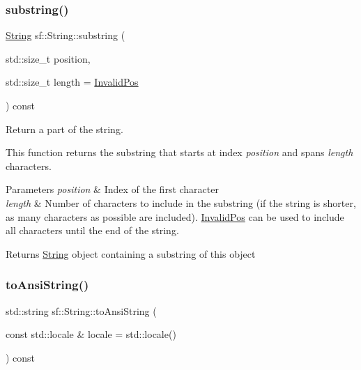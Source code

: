 \subsubsection{\texorpdfstring{substring()}{substring()}}
{\footnotesize\ttfamily \mbox{\hyperlink{classsf_1_1_string}{String}} sf\+::\+String\+::substring (\begin{DoxyParamCaption}\item[{std\+::size\+\_\+t}]{position,  }\item[{std\+::size\+\_\+t}]{length = {\ttfamily \mbox{\hyperlink{classsf_1_1_string_abaadecaf12a6b41c54d725c75fd28527}{Invalid\+Pos}}} }\end{DoxyParamCaption}) const}



Return a part of the string. 

This function returns the substring that starts at index {\itshape position} and spans {\itshape length} characters.


\begin{DoxyParams}{Parameters}
{\em position} & Index of the first character \\
\hline
{\em length} & Number of characters to include in the substring (if the string is shorter, as many characters as possible are included). \mbox{\hyperlink{classsf_1_1_string_abaadecaf12a6b41c54d725c75fd28527}{Invalid\+Pos}} can be used to include all characters until the end of the string.\\
\hline
\end{DoxyParams}
\begin{DoxyReturn}{Returns}
\mbox{\hyperlink{classsf_1_1_string}{String}} object containing a substring of this object \begin{DoxyVerb}\end{DoxyVerb}
 
\end{DoxyReturn}
\mbox{\label{classsf_1_1_string_ada5d5bba4528aceb0a1e298553e6c30a}} 
\subsubsection{\texorpdfstring{toAnsiString()}{toAnsiString()}}
{\footnotesize\ttfamily std\+::string sf\+::\+String\+::to\+Ansi\+String (\begin{DoxyParamCaption}\item[{const std\+::locale \&}]{locale = {\ttfamily std\+:\+:locale()} }\end{DoxyParamCaption}) const}



